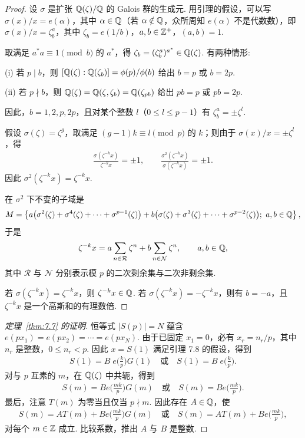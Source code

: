 \begin{proof}
设 $\sigma$ 是扩张 $\mathbb{Q}(\zeta)/\mathbb{Q}$ 的 Galois 群的生成元. 用引理的假设，可以写 $\sigma(x)/x = e(\alpha)$，其中 $\alpha \in \mathbb{Q}$（若 $\alpha \notin \mathbb{Q}$，众所周知 $e(\alpha)$ 不是代数数），即 $\sigma(x)/x = \zeta_b^a$，其中 $\zeta_b = e(1/b)$，$a, b \in \mathbb{Z}^+$，$(a, b) = 1$.

取满足 $a^*a \equiv 1 \pmod b$ 的 $a^*$，得 $\zeta_b = (\zeta_b^a)^{a^*} \in \mathbb{Q}(\zeta)$. 有两种情形:

(i) 若 $p \mid b$，则 $[\mathbb{Q}(\zeta) : \mathbb{Q}(\zeta_b)] = \phi(p)/\phi(b)$ 给出 $b = p$ 或 $b = 2p$.

(ii) 若 $p \nmid b$，则 $\mathbb{Q}(\zeta) = \mathbb{Q}(\zeta, \zeta_b) = \mathbb{Q}(\zeta_{pb})$ 给出 $pb = p$ 或 $pb = 2p$.

因此，$b = 1, 2, p, 2p$，且对某个整数 $l$（$0 \leq l \leq p-1$）有 $\zeta_{b}^{a} = \pm\zeta^{l}$.

假设 $\sigma(\zeta) = \zeta^g$，取满足 $(g - 1)k \equiv l \pmod p$ 的 $k$；则由于 $\sigma(x)/x = \pm\zeta^l$，得
\begin{align*}
  \frac{\sigma(\zeta^{-k}x)}{\zeta^{-k}x}=\pm 1,\qquad
  \frac{\sigma^{2}(\zeta^{-k}x)}{\sigma(\zeta^{-k}x)}=\pm 1.
\end{align*}
因此 $\sigma^{2}(\zeta^{-k}x)=\zeta^{-k}x$.

在 $\sigma^{2}$ 下不变的子域是
\begin{align*}
  M=\left\{a\bigl(\sigma^{2}(\zeta)+\sigma^{4}(\zeta)+\cdots+\sigma^{p-1}(\zeta)\bigr)
  +b\bigl(\sigma(\zeta)+\sigma^{3}(\zeta)+\cdots+\sigma^{p-2}(\zeta)\bigr);\ a,b\in\Q\right\},
\end{align*}
于是
\begin{align*}
  \zeta^{-k}x=a\sum_{n\in\mathcal{R}}\zeta^{n}+b\sum_{n\in\mathcal{N}}\zeta^{n},\qquad a,b\in\mathbb{Q},
\end{align*}
其中 $\mathcal{R}$ 与 $\mathcal{N}$ 分别表示模 $p$ 的二次剩余集与二次非剩余集.

若 $\sigma(\zeta^{-k}x) = \zeta^{-k}x$，则 $\zeta^{-k}x \in \mathbb{Q}$. 若 $\sigma(\zeta^{-k}x) = -\zeta^{-k}x$，则有 $b = -a$，且 $\zeta^{-k}x$ 是一个高斯和的有理数倍.
\end{proof}

\begin{proof}[定理~\ref{thm:7.7} 的证明]
恒等式 $|S(p)| = N$ 蕴含 $e(px_1) = e(px_2) = \cdots = e(px_N)$. 由于已固定 $x_1 = 0$，必有 $x_r = n_r/p$，其中 $n_r$ 是整数，$0 \leq n_r < p$. 因此 $x = S(1)$ 满足引理 7.8 的假设，得到
\begin{align*}
  S(1)=B\;e\Big(\frac{k}{p}\Big)G(1)\quad\text{或}\quad
  S(1)=B\;e\Big(\frac{k}{p}\Big).
\end{align*}
对与 $p$ 互素的 $m$，在 $\mathbb{Q}(\zeta)$ 中共轭，得到
\begin{align*}
  S(m)=B e\Big(\frac{m k}{p}\Big)G(m)\quad\text{或}\quad
  S(m)=B e\Big(\frac{m k}{p}\Big).
\end{align*}
最后，注意 $T(m)$ 为零当且仅当 $p \nmid m$. 因此存在 $A \in \mathbb{Q}$，使
\begin{align*}
  S(m)=A T(m)+B e\Big(\frac{m k}{p}\Big)G(m)\quad\text{或}\quad
  S(m)=A T(m)+B e\Big(\frac{m k}{p}\Big),
\end{align*}
对每个 $m \in \mathbb{Z}$ 成立. 比较系数，推出 $A$ 与 $B$ 是整数.
\end{proof}


